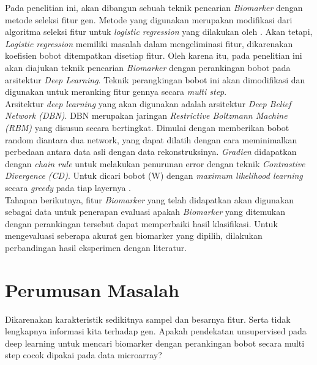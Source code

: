 Pada penelitian ini, akan dibangun sebuah teknik pencarian \textit{Biomarker} dengan metode seleksi fitur gen. Metode yang digunakan merupakan modifikasi dari algoritma seleksi fitur untuk \textit{logistic regression} yang dilakukan oleh \cite{shevade2003simple}. Akan tetapi, \textit{Logistic regression} memiliki masalah dalam  mengeliminasi fitur, dikarenakan koefisien bobot ditempatkan disetiap fitur. Oleh karena itu, pada penelitian ini akan diajukan teknik pencarian \textit{Biomarker} dengan perankingan bobot pada arsitektur \textit{Deep Learning}. Teknik perangkingan bobot ini akan dimodifikasi dan digunakan untuk  meranking fitur gennya secara \textit{multi step}. \\

Arsitektur \textit{deep learning} yang akan digunakan adalah arsitektur \textit{Deep Belief Network (DBN)}. DBN merupakan jaringan \textit{Restrictive Boltzmann Machine (RBM)} yang disusun secara bertingkat. Dimulai dengan memberikan bobot random diantara dua network, yang dapat dilatih dengan cara meminimalkan perbedaan antara data asli dengan data rekonstruksinya. \textit{Gradien} didapatkan dengan \textit{chain rule} untuk melakukan penurunan error dengan teknik \textit{Contrastive Divergence (CD)}. Untuk dicari bobot (W) dengan \textit{maximum likelihood learning}  secara \textit{greedy} pada tiap layernya \citep{hinton2006reducing}. \\

Tahapan berikutnya, fitur \textit{Biomarker} yang telah didapatkan akan digunakan sebagai data untuk penerapan evaluasi apakah \textit{Biomarker} yang ditemukan dengan perankingan tersebut dapat memperbaiki hasil klasifikasi. Untuk mengevaluasi seberapa akurat gen biomarker yang dipilih, dilakukan perbandingan hasil eksperimen dengan literatur. \\






\section{Perumusan Masalah}
Dikarenakan karakteristik sedikitnya sampel dan besarnya fitur. Serta tidak lengkapnya informasi kita terhadap gen. Apakah pendekatan unsupervised pada deep learning untuk mencari biomarker dengan perankingan bobot secara multi step cocok dipakai pada data microarray?


